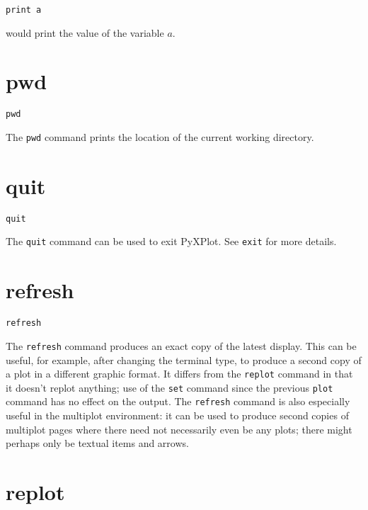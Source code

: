 \begin{verbatim}
print a
\end{verbatim}

\noindent would print the value of the variable $a$.


\section{pwd}

\begin{verbatim}
pwd
\end{verbatim}

The {\tt pwd} command prints the location of the current working directory.



\section{quit}

\begin{verbatim}
quit
\end{verbatim}

The {\tt quit} command can be used to exit PyXPlot. See {\tt exit} for more
details.

\section{refresh}

\begin{verbatim}
refresh
\end{verbatim}

The {\tt refresh} command produces an exact copy of the latest display. This can
be useful, for example, after changing the terminal type, to produce a second
copy of a plot in a different graphic format. It differs from the {\tt replot}
command in that it doesn't replot anything; use of the {\tt set} command since
the previous {\tt plot} command has no effect on the output. The {\tt refresh}
command is also especially useful in the multiplot environment: it can be used
to produce second copies of multiplot pages where there need not necessarily
even be any plots; there might perhaps only be textual items and arrows.

\section{replot}

